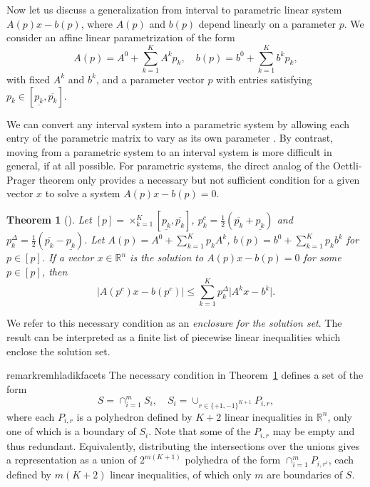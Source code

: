 \documentclass{article}
\newtheorem{theorem}{Theorem}[section]
\theoremstyle{definition}
\theoremstyle{remark}
\begin{document}
Now let us discuss a generalization from interval to parametric linear system $A(p)x - b(p)$, where $A(p)$ and $b(p)$ depend linearly on a parameter $p$. 
%
We consider an affine linear parametrization of the form 
\begin{equation} 
    A(p) = A^0 + \sum_{k=1}^K A^k p_k,\quad 
    b(p) = b^0 + \sum_{k=1}^K b^k p_k, 
\label{eq:parametrization}
\end{equation}
with fixed $A^k$ and $b^k$, and a parameter vector $p$ with entries satisfying $p_k\in[\underline{p_k},\overline{p_k}]$. 

We can convert any interval system into a parametric system by allowing each entry of the parametric matrix to vary as its own parameter \cite{popovaExplicitDescriptionAE2012a}. 
By contrast, moving from a parametric system to an interval system is more difficult in general, if at all possible. 
%
For parametric systems, the direct analog of the Oettli-Prager theorem only provides a necessary but not sufficient condition for a given vector $x$ to solve a system $A(p)x-b(p)=0$. 

\begin{theorem}[{\citealp[Theorem~2]{Hladik-2012}}]
\label{thm:hladik-necessary}
%
Let $[p] = \times_{k=1}^K[\underline{p_k},\overline{p_k}]$, $p_k^c = \frac{1}{2}(\overline{p_k}+\underline{p_k})$ and $p_k^\Delta = \frac{1}{2}(\overline{p_k}-\underline{p_k})$. 
%
Let $A(p) = A^0 + \sum_{k=1}^K p_k A^k$, $b(p)= b^0 + \sum_{k=1}^K p_kb^k$ for $p\in [p]$. 
%
If a vector $x\in\mathbb{R}^n$ is the solution to $A(p)x-b(p)=0$ for some $p \in [p]$, then 
    \begin{equation*}
        \vert A(p^c)x - b(p^c)\vert  \leq \sum_{k=1}^K p_k^{\Delta}\vert A^kx-b^k\vert .
    \end{equation*}
\end{theorem}
%
We refer to this necessary condition as an \textit{enclosure for the solution set}. 
The result can be interpreted as a finite list of piecewise linear inequalities which enclose the solution set. 

\begin{restatable}{remark}{remhladikfacets}
\label{rem:hladik-enclosure-facets}
The necessary condition in Theorem~\ref{thm:hladik-necessary} defines a set of the form 
$$
    S = \cap_{i=1}^m S_i, \quad S_i = \cup_{r\in\{+1,-1\}^{K+1}} P_{i,r}, 
$$
where each $P_{i,r}$ is a polyhedron defined by $K+2$ linear inequalities in $\mathbb{R}^n$, only one of which is a boundary of $S_i$. 
Note that some of the $P_{i,r}$ may be empty and thus redundant. 
%
Equivalently, distributing the intersections over the unions gives a representation as a union of $2^{m(K+1)}$ polyhedra of the form $\cap_{i=1}^m P_{i,r^i}$, each defined by $m(K+2)$ linear inequalities, of which only $m$ are boundaries of $S$. 
%
\end{restatable} 
\end{document}
